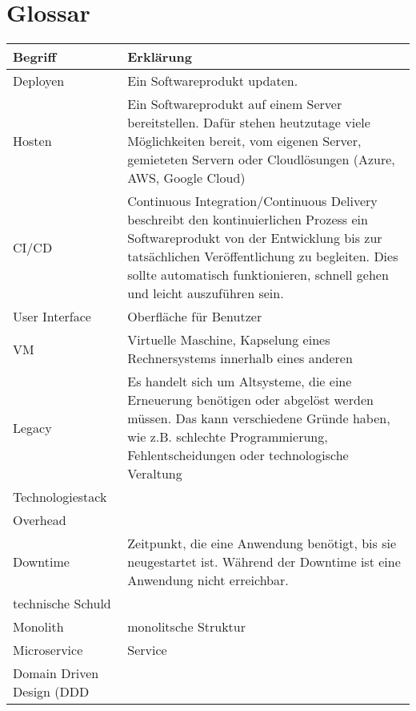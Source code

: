 \section{Glossar}
\begin{center}
	\begin{tabular}{lp{10cm}}
		Begriff & Erklärung \\ \hline
		Deployen & Ein Softwareprodukt updaten.  \\
		Hosten & Ein Softwareprodukt auf einem Server bereitstellen. Dafür stehen heutzutage viele Möglichkeiten bereit, vom eigenen Server, gemieteten Servern oder Cloudlösungen (Azure, AWS, Google Cloud) \\
		CI/CD & Continuous Integration/Continuous Delivery beschreibt den kontinuierlichen Prozess ein Softwareprodukt von der Entwicklung bis zur tatsächlichen Veröffentlichung zu begleiten. Dies sollte automatisch funktionieren, schnell gehen und leicht auszuführen sein.  \\
		User Interface  & Oberfläche für Benutzer  \\
		VM & Virtuelle Maschine, Kapselung eines Rechnersystems innerhalb eines anderen  \\
		Legacy & Es handelt sich um Altsysteme, die eine Erneuerung benötigen oder abgelöst werden müssen. Das kann verschiedene Gründe haben, wie z.B. schlechte Programmierung, Fehlentscheidungen oder technologische Veraltung   \\
		Technologiestack &   \\
		Overhead &   \\
		Downtime & Zeitpunkt, die eine Anwendung benötigt, bis sie neugestartet ist. Während der Downtime ist eine Anwendung nicht erreichbar.  \\
		technische Schuld &   \\
		Monolith & monolitsche Struktur \\
		Microservice & Service  \\	
		Domain Driven Design (DDD &   \\	
	\end{tabular}
\end{center}